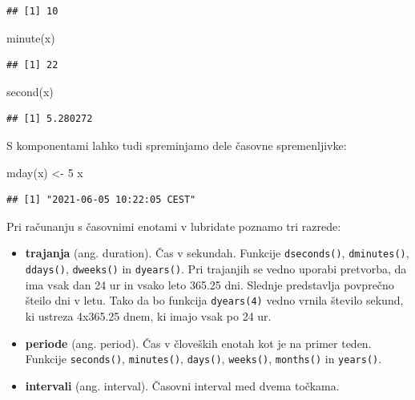 \documentclass[
]{book}
\newenvironment{Shaded}{\begin{snugshade}}{\end{snugshade}}
\newcommand{\DecValTok}[1]{\textcolor[rgb]{0.00,0.00,0.81}{#1}}
\newcommand{\FunctionTok}[1]{\textcolor[rgb]{0.00,0.00,0.00}{#1}}
\newcommand{\NormalTok}[1]{#1}
\newcommand{\OtherTok}[1]{\textcolor[rgb]{0.56,0.35,0.01}{#1}}
\providecommand{\tightlist}{%
  \setlength{\itemsep}{0pt}\setlength{\parskip}{0pt}}
\begin{document}
\begin{verbatim}
## [1] 10
\end{verbatim}

\begin{Shaded}
\begin{Highlighting}[]
\FunctionTok{minute}\NormalTok{(x)}
\end{Highlighting}
\end{Shaded}

\begin{verbatim}
## [1] 22
\end{verbatim}

\begin{Shaded}
\begin{Highlighting}[]
\FunctionTok{second}\NormalTok{(x)}
\end{Highlighting}
\end{Shaded}

\begin{verbatim}
## [1] 5.280272
\end{verbatim}

S komponentami lahko tudi spreminjamo dele časovne spremenljivke:

\begin{Shaded}
\begin{Highlighting}[]
\FunctionTok{mday}\NormalTok{(x) }\OtherTok{\textless{}{-}} \DecValTok{5}
\NormalTok{x}
\end{Highlighting}
\end{Shaded}

\begin{verbatim}
## [1] "2021-06-05 10:22:05 CEST"
\end{verbatim}

Pri računanju s časovnimi enotami v lubridate poznamo tri razrede:

\begin{itemize}
\tightlist
\item
  \textbf{trajanja} (ang. duration). Čas v sekundah. Funkcije \texttt{dseconds()}, \texttt{dminutes()}, \texttt{ddays()}, \texttt{dweeks()} in \texttt{dyears()}. Pri trajanjih se vedno uporabi pretvorba, da ima vsak dan 24 ur in vsako leto 365.25 dni. Slednje predstavlja povprečno šteilo dni v letu. Tako da bo funkcija \texttt{dyears(4)} vedno vrnila število sekund, ki ustreza 4x365.25 dnem, ki imajo vsak po 24 ur.
\item
  \textbf{periode} (ang. period). Čas v človeških enotah kot je na primer teden. Funkcije \texttt{seconds()}, \texttt{minutes()}, \texttt{days()}, \texttt{weeks()}, \texttt{months()} in \texttt{years()}.
\item
  \textbf{intervali} (ang. interval). Časovni interval med dvema točkama.
\end{itemize}
\end{document}
